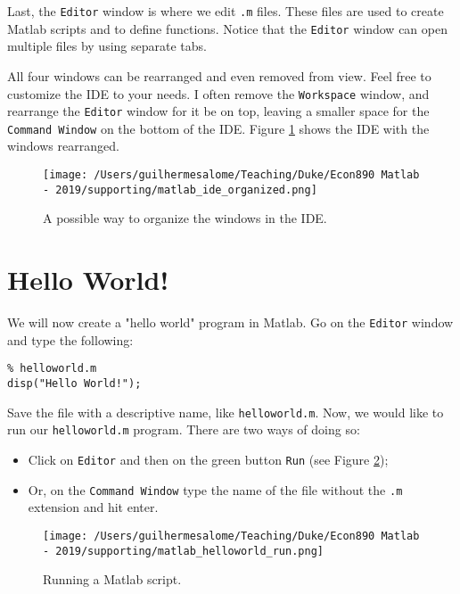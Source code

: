 \documentclass[12pt, a4paper]{article}
\begin{document}
Last, the \texttt{Editor} window is where we edit \texttt{.m} files.
These files are used to create Matlab scripts and to define functions.
Notice that the \texttt{Editor} window can open multiple files by using separate tabs.

All four windows can be rearranged and even removed from view.
Feel free to customize the IDE to your needs.
I often remove the \texttt{Workspace} window, and rearrange the \texttt{Editor} window for it be on top, leaving a smaller space for the \texttt{Command Window} on the bottom of the IDE.
Figure \ref{fig:org8572d23} shows the IDE with the windows rearranged.

\begin{figure}[!ht]
\centering
\texttt{[image: /Users/guilhermesalome/Teaching/Duke/Econ890 Matlab - 2019/supporting/matlab\_ide\_organized.png]}
\caption{\label{fig:org8572d23}
A possible way to organize the windows in the IDE.}
\end{figure}

\section{Hello World!}
\label{sec:org185e86a}
We will now create a "hello world" program in Matlab.
Go on the \texttt{Editor} window and type the following:
\lstset{language=matlab,label= ,caption= ,captionpos=b,firstnumber=1,numbers=left,style=Matlab-editor}
\begin{lstlisting}
% helloworld.m
disp("Hello World!");
\end{lstlisting}
Save the file with a descriptive name, like \texttt{helloworld.m}.
Now, we would like to run our \texttt{helloworld.m} program.
There are two ways of doing so:
\begin{itemize}
\item Click on \texttt{Editor} and then on the green button \texttt{Run} (see Figure \ref{fig:org72d94dd});
\item Or, on the \texttt{Command Window} type the name of the file without the \texttt{.m} extension and hit enter.
\end{itemize}

\begin{figure}[!ht]
\centering
\texttt{[image: /Users/guilhermesalome/Teaching/Duke/Econ890 Matlab - 2019/supporting/matlab\_helloworld\_run.png]}
\caption{\label{fig:org72d94dd}
Running a Matlab script.}
\end{figure}
\end{document}
